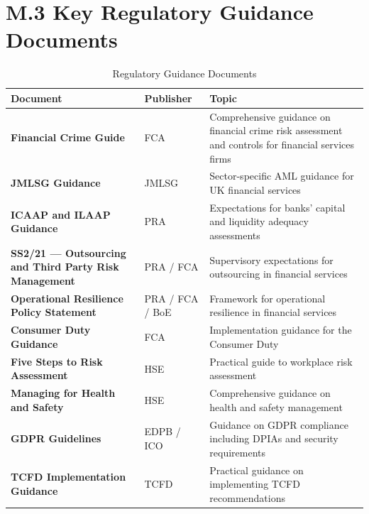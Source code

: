 \section*{M.3 Key Regulatory Guidance Documents}
\begin{table}[H]
  \centering
  \renewcommand{\arraystretch}{1.5}
  \begin{tabularx}{\textwidth}{ | >{\raggedright\arraybackslash}p{} 
								| >{\raggedright\arraybackslash}p{} 
                                | >{\raggedright\arraybackslash}X | }
    \hline
    \textbf{Document} & \textbf{Publisher} & \textbf{Topic} \\
    \hline
    \textbf{Financial Crime Guide} & FCA & Comprehensive guidance on financial crime risk assessment and controls for financial services firms\\
    \hline
    \textbf{JMLSG Guidance} & JMLSG & Sector-specific AML guidance for UK financial services\\
    \hline
    \textbf{ICAAP and ILAAP Guidance} & PRA & Expectations for banks' capital and liquidity adequacy assessments\\
    \hline
    \textbf{SS2/21 — Outsourcing and Third Party Risk Management} & PRA / FCA & Supervisory expectations for outsourcing in financial services\\
    \hline
    \textbf{Operational Resilience Policy Statement} & PRA / FCA / BoE & Framework for operational resilience in financial services\\
    \hline
    \textbf{Consumer Duty Guidance} & FCA & Implementation guidance for the Consumer Duty\\
    \hline
    \textbf{Five Steps to Risk Assessment} & HSE & Practical guide to workplace risk assessment\\
    \hline
    \textbf{Managing for Health and Safety} & HSE & Comprehensive guidance on health and safety management\\
    \hline
    \textbf{GDPR Guidelines} & EDPB / ICO & Guidance on GDPR compliance including DPIAs and security requirements\\
    \hline
    \textbf{TCFD Implementation Guidance} & TCFD & Practical guidance on implementing TCFD recommendations\\
    \hline
  \end{tabularx}
  \caption{Regulatory Guidance Documents}
\end{table}